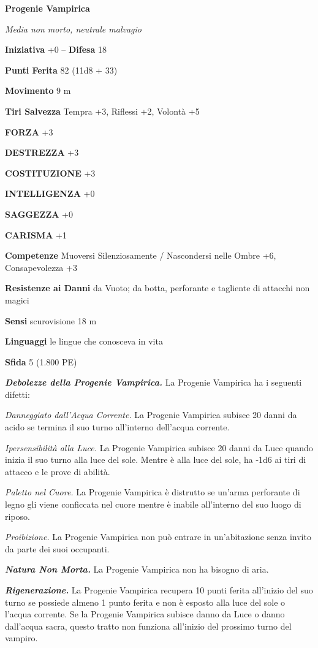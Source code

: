 \begin{multicols}{2}
\medskip{}\textbf{Progenie Vampirica}

\emph{Media non morto, neutrale malvagio}

\textbf{Iniziativa} +0 -- \textbf{Difesa} 18

\textbf{Punti Ferita} 82 (11d8 + 33)

\textbf{Movimento} 9 m

\textbf{Tiri Salvezza} Tempra +3, Riflessi +2, Volontà +5

\textbf{FORZA} +3

\textbf{DESTREZZA} +3

\textbf{COSTITUZIONE} +3

\textbf{INTELLIGENZA} +0

\textbf{SAGGEZZA} +0

\textbf{CARISMA} +1

\textbf{Competenze} Muoversi Silenziosamente / Nascondersi nelle Ombre +6, Consapevolezza +3

\textbf{Resistenze ai Danni} da Vuoto; da botta, perforante e tagliente di attacchi non magici

\textbf{Sensi} scurovisione 18 m

\textbf{Linguaggi} le lingue che conosceva in vita 

\textbf{Sfida} 5 (1.800 PE)

\emph{\textbf{Debolezze della Progenie Vampirica.}} La Progenie Vampirica ha i seguenti difetti:

\emph{Danneggiato dall'Acqua Corrente.} La Progenie Vampirica subisce 20 danni da acido se termina il suo turno all'interno dell'acqua corrente.

\emph{Ipersensibilità alla Luce.} La Progenie Vampirica subisce 20 danni da Luce quando inizia il suo turno alla luce del sole. Mentre è alla luce del sole, ha -1d6 ai tiri di attacco e le prove di abilità.

\emph{Paletto nel Cuore.} La Progenie Vampirica è distrutto se un'arma perforante di legno gli viene conficcata nel cuore mentre è inabile all'interno del suo luogo di riposo.

\emph{Proibizione.} La Progenie Vampirica non può entrare in un'abitazione senza invito da parte dei suoi occupanti.

\emph{\textbf{Natura Non Morta.}} La Progenie Vampirica non ha bisogno di aria.

\emph{\textbf{Rigenerazione.}} La Progenie Vampirica recupera 10 punti ferita all'inizio del suo turno se possiede almeno 1 punto ferita e non è esposto alla luce del sole o l'acqua corrente. Se la Progenie Vampirica subisce danno da Luce o danno dall'acqua sacra, questo tratto non funziona all'inizio del prossimo turno del vampiro.


\end{multicols}
